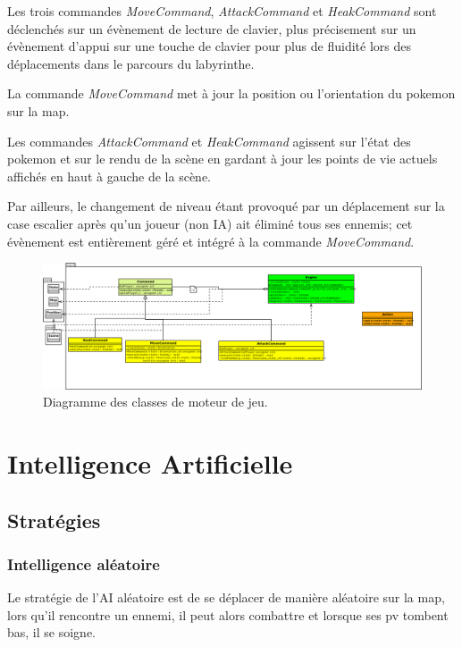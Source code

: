 \documentclass[a4paper,12pt]{article}
\begin{document}
Les trois commandes \emph{MoveCommand}, \emph{AttackCommand} et \emph{HeakCommand} sont déclenchés sur un évènement de lecture de clavier, plus précisement sur un évènement d'appui sur une touche de clavier pour plus de fluidité lors des déplacements dans le parcours du labyrinthe.

La commande \emph{MoveCommand} met à jour la position ou l'orientation du pokemon sur la map.

Les commandes \emph{AttackCommand} et \emph{HeakCommand} agissent sur l'état des pokemon et sur le rendu de la scène en gardant à jour les points de vie actuels affichés en haut à gauche de la scène.

Par ailleurs, le changement de niveau étant provoqué par un déplacement sur la case escalier après qu'un joueur (non IA) ait éliminé tous ses ennemis; cet évènement est entièrement géré et intégré à la commande \emph{MoveCommand}.

    \begin{landscape}
    \begin{figure}[p]
    \includegraphics[width=0.9\paperheight]{engine.png}
    \caption{\label{uml:engine}Diagramme des classes de moteur de jeu.}
    \end{figure}
    \end{landscape}


    \section{Intelligence Artificielle}

    \subsection{Stratégies}
    \subsubsection{Intelligence aléatoire}
    
    Le stratégie de l'AI aléatoire est de se déplacer de manière aléatoire sur la map, lors qu'il rencontre un ennemi, il peut alors combattre et lorsque ses pv tombent bas, il se soigne.
    
\end{document}
